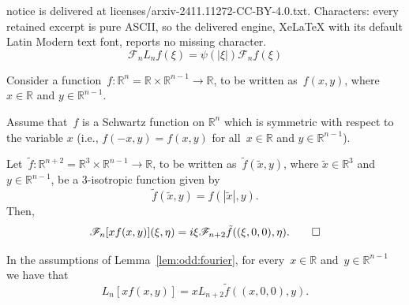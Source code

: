 \documentclass[10pt,a4paper]{amsart}
\newcommand{\R}{\mathds{R}}
\newcommand{\fourier}{\mathscr{F}}
\begin{document}
notice is delivered at licenses/arxiv-2411.11272-CC-BY-4.0.txt. Characters: every retained excerpt is pure ASCII, so the delivered engine, XeLaTeX with its default Latin Modern text font, reports no missing character.
\begin{equation}\label{FOU:SI}
 \fourier_n L_n f(\xi)  = \psi(|\xi|) \fourier_n f(\xi)
\end{equation}

\begin{lemma}
\label{lem:odd:fourier}
Consider a function~$f:\R^n=\R\times\R^{n-1}\to\R$,
to be written as~$f(x, y)$, where $x \in \R$ and $y \in \R^{n - 1}$.


Assume that~$f$ is a Schwartz function on $\R^n$ which is symmetric with respect to the variable $x$ (i.e., $f(-x, y) = f(x, y)$
for all~$x \in \R$ and $y \in \R^{n - 1}$).


Let~$\tilde f:\R^{n+2}=\R^3\times\R^{n-1}\to\R$,
to be written as~$\tilde{f}(\tilde{x}, y)$, where $\tilde{x} \in \R^3$ and $y \in \R^{n - 1}$, be a $3$-isotropic function given by
\[
 \tilde{f}(\tilde{x}, y) = f(|\tilde{x}|, y) .
\]
Then,
\[
 \fourier_n[x f(x, y)](\xi, \eta) = i \xi \fourier_{n + 2} \tilde{f}((\xi, 0, 0), \eta) . \qedhere
\]
\end{lemma}

\begin{lemma}
\label{lem:odd:operator}
In the assumptions of Lemma~\ref{lem:odd:fourier}, for every~$x\in\R$ and~$y\in\R^{n-1}$ we have that
\[
 L_n[x f(x, y)] = x L_{n + 2} \tilde{f}((x, 0, 0), y) .
\]
\end{lemma}
\end{document}
